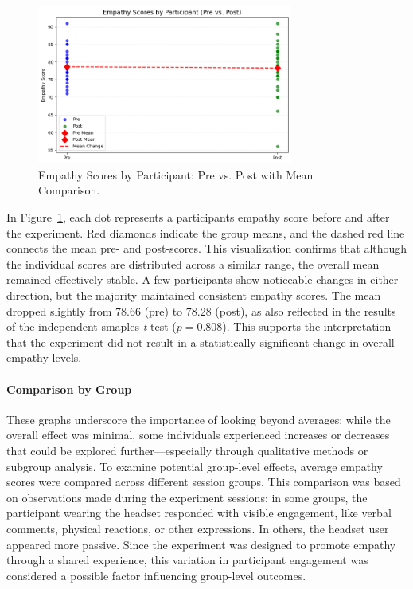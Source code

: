 \begin{figure}[htbp]
    \centering
    \includegraphics[width=0.75\textwidth]{../../Figures/emph-comparison-means.png}
    \caption{Empathy Scores by Participant: Pre vs. Post with Mean Comparison.}
    \label{fig:empathy_means_line}
\end{figure}

\vspace{1em}

In Figure~\ref{fig:empathy_means_line}, each dot represents a participants empathy score before and after the experiment. Red diamonds indicate the group means, and the dashed red line connects the mean pre- and post-scores. This visualization confirms that although the individual scores are distributed across a similar range, the overall mean remained effectively stable. A few participants show noticeable changes in either direction, but the majority maintained consistent empathy scores. The mean dropped slightly from 78.66 (pre) to 78.28 (post), as also reflected in the results of the independent smaples \textit{t}-test ($p = 0.808$). This supports the interpretation that the experiment did not result in a statistically significant change in overall empathy levels.

\paragraph{Comparison by Group}

These graphs underscore the importance of looking beyond averages: while the overall effect was minimal, some individuals experienced increases or decreases that could be explored further—especially through qualitative methods or subgroup analysis. To examine potential group-level effects, average empathy scores were compared across different session groups. This comparison was based on observations made during the experiment sessions: in some groups, the participant wearing the headset responded with visible engagement, like verbal comments, physical reactions, or other expressions. In others, the headset user appeared more passive. Since the experiment was designed to promote empathy through a shared experience, this variation in participant engagement was considered a possible factor influencing group-level outcomes.


